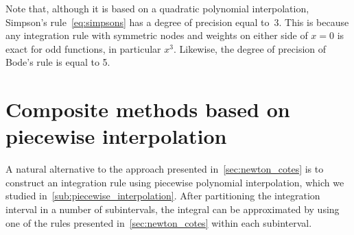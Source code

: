 Note that,
although it is based on a quadratic polynomial interpolation,
Simpson's rule~\eqref{eq:simpsons} has a degree of precision equal to~$3$.
This is because any integration rule with symmetric nodes and weights on either side of $x=0$ is exact for odd functions,
in particular $x^3$.
Likewise, the degree of precision of Bode's rule is equal to 5.

\section{Composite methods based on piecewise interpolation}
A natural alternative to the approach presented in~\cref{sec:newton_cotes}
is to construct an integration rule using piecewise polynomial interpolation,
which we studied in~\cref{sub:piecewise_interpolation}.
After partitioning the integration interval in a number of subintervals,
the integral can be approximated by using one of the rules presented in~\eqref{sec:newton_cotes} within each subinterval.

